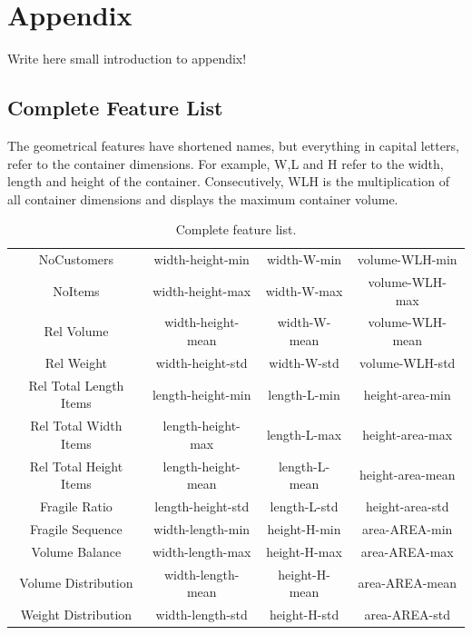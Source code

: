 \appendix
\chapter{Appendix}

Write here small introduction to appendix! %
\clearpage
\section{Complete Feature List}

The geometrical features have shortened names, but everything in capital letters, refer to the container
dimensions. For example, W,L and H refer to the width, length and height of the container. Consecutively,
WLH is the multiplication of all container dimensions and displays the maximum container volume.

\begin{table}[ht]
    \centering
    \small
    \renewcommand{\arraystretch}{1.3}
    \begin{tabular}{@{}cccc@{}}
        NoCustomers            & width-height-min   & width-W-min   & volume-WLH-min   \\
        NoItems                & width-height-max   & width-W-max   & volume-WLH-max   \\
        Rel Volume             & width-height-mean  & width-W-mean  & volume-WLH-mean  \\
        Rel Weight             & width-height-std   & width-W-std   & volume-WLH-std   \\
        Rel Total Length Items & length-height-min  & length-L-min  & height-area-min  \\
        Rel Total Width Items  & length-height-max  & length-L-max  & height-area-max  \\
        Rel Total Height Items & length-height-mean & length-L-mean & height-area-mean \\
        Fragile Ratio          & length-height-std  & length-L-std  & height-area-std  \\
        Fragile Sequence       & width-length-min   & height-H-min  & area-AREA-min    \\
        Volume Balance         & width-length-max   & height-H-max  & area-AREA-max    \\
        Volume Distribution    & width-length-mean  & height-H-mean & area-AREA-mean   \\
        Weight Distribution    & width-length-std   & height-H-std  & area-AREA-std    \\
    \end{tabular}
    \caption{Complete feature list.}
    \label{tab:complete_features_list}
\end{table}

